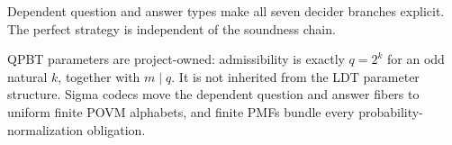 
Dependent question and answer types make all seven decider branches explicit.
The perfect strategy is independent of the soundness chain.

QPBT parameters are project-owned: admissibility is exactly $q=2^k$ for an
odd natural $k$, together with $m\mid q$.  It is not inherited from the LDT
parameter structure.  Sigma codecs move the dependent question and answer
fibers to uniform finite POVM alphabets, and finite PMFs bundle every
probability-normalization obligation.


